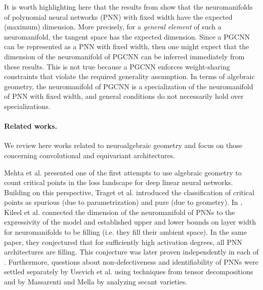 \documentclass[final]{article}
\theoremstyle{definition}
\theoremstyle{plain}
\begin{document}
It is worth highlighting here that the results from 
\cite{massarenti2025alexanderhirschowitztheoremneurovarieties, usevich2025identifiabilitydeeppolynomialneural, finkel2025activationdegreethresholdsexpressiveness,  craciun2025linearindependencepowerspolynomials} 
show that the neuromanifolds of polynomial neural networks (PNN) with fixed width have the expected (maximum) dimension. More precisely, for a \emph{general element} of such a neuromanifold, the tangent space has the expected dimension.
Since a PGCNN can be represented as a PNN with fixed width, then one might expect that the dimension of the neuromanifold of PGCNN can be inferred immediately from these results. 
This is not true because a PGCNN enforces weight-sharing  constraints that violate the required generality assumption. In terms of algebraic geometry, the neuromanifold of PGCNN is a specialization of the neuromanifold of PNN with fixed width, and general conditions do not necessarily hold over specializations.

\paragraph{Related works.}

We review here works related to neuroalgebraic geometry and focus on those concerning convolutional and equivariant architectures.

Mehta et al. \cite{mehta2018losssurfacedeeplinear} presented one of the first attempts to use algebraic geometry to count critical points in the loss landscape for deep linear neural networks. 
Building on this perspective, Traget et al.  \cite{trager2020purespuriouscriticalpoints} introduced the classification of critical points as spurious (due to parametrization) and pure (due to geometry).
In \cite{DBLP:journals/corr/abs-1905-12207}, Kileel et al. connected the dimension of the neuromanifold of PNNs to the expressivity of the model and established upper and lower bounds on layer width for neuromanifolds to be filling (i.e. they fill their ambient space).
In the same paper, they conjectured that for sufficiently high activation degrees, all PNN architectures are filling. This conjecture was later proven independently in each of \cite{finkel2025activationdegreethresholdsexpressiveness, massarenti2025alexanderhirschowitztheoremneurovarieties, craciun2025linearindependencepowerspolynomials}. 
Furthermore, questions about non-defectiveness and identifiability of PNNs were settled separately by
Usevich et al. \cite{usevich2025identifiabilitydeeppolynomialneural} using techniques from tensor decompositions and by Massarenti and Mella \cite{massarenti2025alexanderhirschowitztheoremneurovarieties} by analyzing secant varieties.
\end{document}
